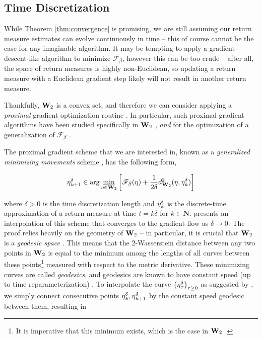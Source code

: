 \subsection{Time Discretization}
While Theorem \ref{thm:convergence} is promising, we are still
assuming our return measure estimates can evolve continuously in time
-- this of course cannot be the case for any imaginable algorithm. It
may be tempting to apply a gradient-descent-like algorithm to minimize
$\mathscr{F}_\beta$, however this can be too crude -- after all, the
space of return measures is highly non-Euclidean, so updating a return
measure with a Euclidean gradient step likely will not result in
another return measure.

Thankfully, $\mathbf{W}_{2}$ is a convex set, and therefore we can
consider applying a \emph{proximal} gradient optimization routine
\citep{rockafellar2015convex}. In particular, such proximal gradient
algorithms have been studied specifically in $\mathbf{W}_{2}$
\citep{Santambrogio2016EuclideanMA, salim2020wasserstein}, \emph{and}
for the optimization of a generalization of $\mathscr{F}_\beta$
\citep{Jordan02thevariational, villani2008optimal,
  Santambrogio2016EuclideanMA, chizat2018global, Zhang2018PolicyOA,
  martin2020stochastically}. 

The proximal gradient scheme that we are interested in, known as a
\emph{generalized minimizing movements} scheme \citep{de1993new}, has the
following form,

\begin{equation}
  \label{eq:proximal-gradient}
  \operatorname{\eta}^\delta_{k+1}\in\arg\min_{\operatorname{\eta}\in\mathbf{W}_{2}}\left[\mathscr{F}_\beta(\operatorname{\eta})
    + \frac{1}{2\delta}d_{\mathbf{W}_{2}}^2(\operatorname{\eta}, \operatorname{\eta}^\delta_k)\right]
\end{equation}

where $\delta>0$ is the time discretization length and
$\operatorname{\eta}^\delta_{k}$ is the discrete-time approximation of a
return measure at time $t = k\delta$ for
$k\in\mathbf{N}$. \citet{Jordan02thevariational} presents an
interpolation of this scheme that converges to the gradient flow as
$\delta\to 0$. The proof relies heavily on the geometry of
$\mathbf{W}_{2}$ -- in particular, it is crucial that $\mathbf{W}_{2}$ is
a \emph{geodesic space} \citep{villani2008optimal,
  ambrosio2008gradient}. This means that the 2-Wasserstein distance
between any two points in $\mathbf{W}_{2}$ is equal to the minimum among
the lengths of all curves between these points\footnote{It is
  imperative that this minimum exists, which is the case in
  $\mathbf{W}_{2}$ \citep{villani2008optimal}.} measured with respect to
the metric derivative. These minimizing curves are called
\emph{geodesics}, and geodesics are known to have constant speed (up
to time reparameterization) \citep{santambrogio2015optimal}. To
interpolate the curve $\left(\operatorname{\eta}^\delta_{\tau}\right)_{\tau \geq 0}$ as
suggested by \citet{Jordan02thevariational}, we simply connect
consecutive points $\operatorname{\eta}^\delta_k,
\operatorname{\eta}^\delta_{k+1}$ by the constant speed geodesic between
them, resulting in

